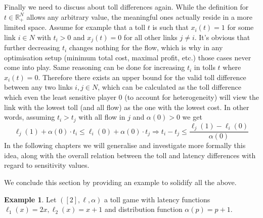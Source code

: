 \documentclass[10pt,a4paper]{book}
\newcommand{\R}{\mathbb{R}}
\theoremstyle{definition}
\theoremstyle{comment}
\newtheorem{example}[definition]{Example}
\begin{document}
Finally we need to discuss about toll differences again.
While the definition for $t \in \R_+^N$ allows any arbitrary value, the meaningful ones actually reside in a more limited space.
Assume for example that a toll $t$ is such that $x_i(t) = 1$ for some link $i \in N$ with $t_i > 0$ and $x_j(t) = 0$ for all other links $j \ne i$.
It's obvious that further decreasing $t_i$ changes nothing for the flow, which is why in any optimisation setup (minimum total cost, maximal profit, etc.) those cases never come into play. Same reasoning can be done for increasing $t_i$ in tolls $t$ where $x_i(t) = 0$.
Therefore there exists an upper bound for the valid toll difference between any two links $i, j \in N$, which can be calculated as the toll difference which even the least sensitive player $0$ (to account for heterogeneity) will view the link with the lowest toll (and all flow) as the one with the lowest cost.
In other words, assuming $t_i > t_j$ with all flow in $j$ and $\alpha(0) > 0$ we get
\[\ell_j(1) + \alpha(0) \cdot t_i \le \ell_i(0) + \alpha(0) \cdot t_j \Rightarrow t_i - t_j \le \frac{\ell_j(1) - \ell_i(0)}{\alpha(0)}\]
In the following chapters we will generalise and investigate more formally this idea, along with the overall relation between the toll and latency differences with regard to sensitivity values.

We conclude this section by providing an example to solidify all the above.

\begin{example}
	\label{example:simple_alpha}
	Let $([2], \ell, \alpha)$ a toll game with latency functions $\ell_1(x) = 2x, \ell_2(x) = x + 1$ and distribution function $\alpha(p) = p + 1$.
\end{example}
\end{document}
